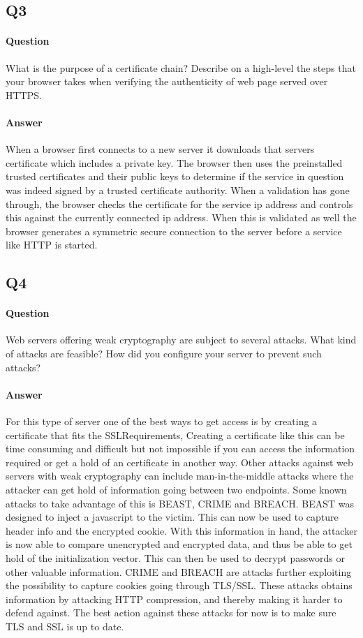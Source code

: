 \documentclass[11pt, a4paper]{article}
\begin{document}
\subsection{Q3}
\paragraph{Question}
What is the purpose of a certificate chain? Describe on a high-level the steps that your
browser takes when verifying the authenticity of web page served over HTTPS.
\paragraph{Answer}
When a browser first connects to a new server it downloads that servers certificate which includes a private key. The browser then uses the preinstalled trusted certificates and their public keys to determine if the service in question was indeed signed by a trusted certificate authority. When a validation has gone through, the browser checks the certificate for the service ip address and controls this against the currently connected ip address. When this is validated as well the browser generates a symmetric secure connection to the server before a service like HTTP is started. 
\subsection{Q4}
\paragraph{Question}
Web servers offering weak cryptography are subject to several attacks. What kind of
attacks are feasible? How did you configure your server to prevent such attacks?
\paragraph{Answer}
For this type of server one of the best ways to get access is by creating a certificate that fits the SSLRequirements, Creating a certificate like this can be time consuming and difficult but not impossible if you can access the information required or get a hold of an certificate in another way.
Other attacks against web servers with weak cryptography can include man-in-the-middle attacks where the attacker can get hold of information going between two endpoints. Some known attacks to take advantage of this is BEAST, CRIME and BREACH. BEAST was designed to inject a javascript to the victim. This can now be used to capture header info and the encrypted cookie. With this information in hand, the attacker is now able to compare unencrypted and encrypted data, and thus be able to get hold of the initialization vector. This can then be used to decrypt passwords or other valuable information. CRIME and BREACH are attacks further exploiting the possibility to capture cookies going through TLS/SSL. These attacks obtains information by attacking HTTP compression, and thereby making it harder to defend against. The best action against these attacks for now is to make sure TLS and SSL is up to date.
\end{document}
